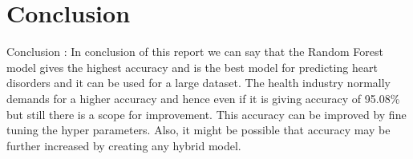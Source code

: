\documentclass{article}
\begin{document}
\section{Conclusion}

Conclusion : 
In conclusion of this report we can say that the Random Forest model gives the highest accuracy and is the best model for predicting heart disorders and it can be used for a large dataset. The health industry normally demands for a higher accuracy and hence even if it is giving accuracy of 95.08\% but still there is a scope for improvement. This accuracy can be improved by fine tuning the hyper parameters. Also, it might be possible that accuracy may be further increased by creating any hybrid model. 


\printbibliography 
\end{document}
